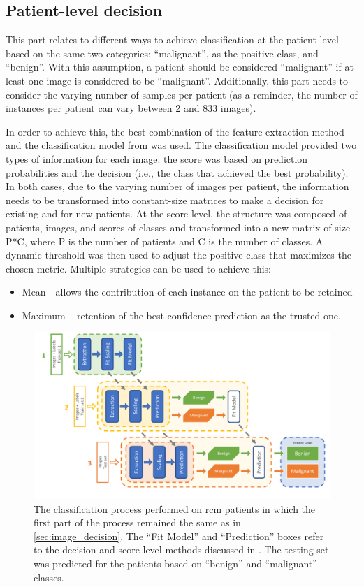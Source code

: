 \documentclass[journal,article,submit,moreauthors,pdftex, applsci]{Definitions/mdpi}
\begin{document}
\subsection{Patient-level decision}
\label{sec:patient_decision}
This part relates to different ways to achieve classification at the patient-level based on the same two categories: “malignant”, as the positive class, and “benign”. With this assumption, a patient should be considered “malignant” if at least one image is considered to be “malignant”. Additionally, this part needs to consider the varying number of samples per patient (as a reminder, the number of instances per patient can vary between 2 and 833 images).\par
In order to achieve this, the best combination of the feature extraction method and the classification model from  was used. The classification model provided two types of information for each image: the score was based on prediction probabilities and the decision (i.e., the class that achieved the best probability). In both cases, due to the varying number of images per patient, the information needs to be transformed into constant-size matrices to make a decision for existing and for new patients. At the score level, the structure was composed of patients, images, and scores of classes and transformed into a new matrix of size P*C, where P is the number of patients and C is the number of classes. A dynamic threshold was then used to adjust the positive class that maximizes the chosen metric. Multiple strategies can be used to achieve this:
\begin{itemize}
\item Mean - allows the contribution of each instance on the patient to be retained
\item Maximum – retention of the best confidence prediction as the trusted one.
\end{itemize}
\begin{figure}[H]
    \begin{center}
        \includegraphics[width=0.8\linewidth]{Figures/Process_Decision.pdf}
        \caption{The classification process performed on \ac{rcm} patients in which the first part of the process remained the same as in \cref{sec:image_decision}. The “Fit Model” and “Prediction” boxes refer to the decision and score level methods discussed in . The testing set was predicted for the patients based on “benign” and “malignant” classes.}
        \label{fig:decision_process}
    \end{center} 
\end{figure}\par
\end{document}
